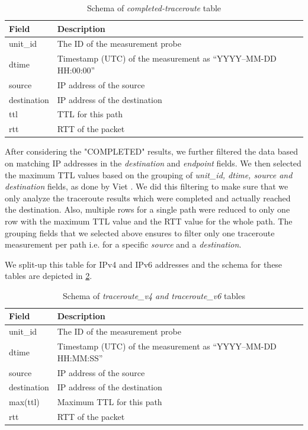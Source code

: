 \begin{table}[!h]
	\centering
	\caption{Schema of \textit{completed-traceroute} table}
	\label{table:completed}
	\begin{tabular}{lp{8cm}}
  		\toprule
  		\textbf{Field} & \textbf{Description} \\ 
  		\midrule
  		unit\_id & The ID of the measurement probe \\ 
  		dtime & Timestamp (UTC) of the measurement as “YYYY–MM-DD HH:00:00” \\  
		source &  IP address of the source \\ 
		destination & IP address of the destination \\   
		ttl & TTL for this path \\ 
		rtt & RTT of the packet \\
  		\bottomrule
\end{tabular}
\end{table}

\FloatBarrier

After considering the "COMPLETED" results, we further filtered the data based on matching IP addresses in the \textit{destination} and \textit{endpoint} fields. We then selected the maximum TTL values based on the grouping of \textit{unit\_id, dtime, source and destination} fields, as done by Viet \cite{viet}. We did this filtering to make sure that we only analyze the traceroute results which were completed and actually reached the destination. Also, multiple rows for a single path were reduced to only one row with the maximum TTL value and the RTT value for the whole path. The grouping fields that we selected above ensures to filter only one traceroute measurement per path i.e. for a specific \textit{source} and a \textit{destination}. 

We split-up this table for IPv4 and IPv6 addresses and the schema for these tables are depicted in \cref{table:traceroutev4v6}.

\begin{table}[!h]
	\centering
	\caption{Schema of \textit{traceroute\_v4 and traceroute\_v6} tables}
	\label{table:traceroutev4v6}
	\begin{tabular}{lp{8cm}}
  		\toprule
  		\textbf{Field} & \textbf{Description} \\ 
  		\midrule
  		unit\_id & The ID of the measurement probe \\ 
  		dtime & Timestamp (UTC) of the measurement as “YYYY–MM-DD HH:MM:SS” \\  
		source &  IP address of the source \\ 
		destination & IP address of the destination \\   
		max(ttl) & Maximum TTL for this path \\ 
		rtt & RTT of the packet \\
  		\bottomrule
\end{tabular}
\end{table}

